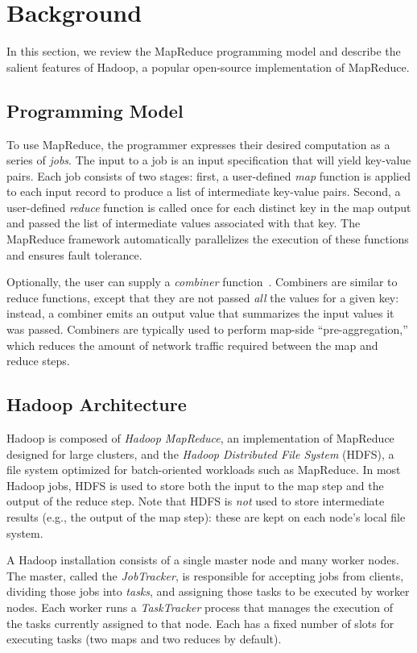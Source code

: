 \section{Background}
\label{sec:background}
In this section, we review the MapReduce programming model and describe the
salient features of Hadoop, a popular open-source implementation of MapReduce.

\subsection{Programming Model}
\label{sec:progmodel}
To use MapReduce, the programmer expresses their desired computation as a series
of \emph{jobs}. The input to a job is an input specification that will yield
key-value pairs. Each job consists of two stages: first, a user-defined
\emph{map} function is applied to each input record to produce a list of
intermediate key-value pairs. Second, a user-defined \emph{reduce} function is
called once for each distinct key in the map output and passed the list of
intermediate values associated with that key.  The MapReduce framework
automatically parallelizes the execution of these functions and ensures fault
tolerance.

Optionally, the user can supply a \emph{combiner}
function~\cite{mapreduce-osdi}. Combiners are similar to reduce functions,
except that they are not passed \emph{all} the values for a given key: instead,
a combiner emits an output value that summarizes the input values it was
passed. Combiners are typically used to perform map-side ``pre-aggregation,''
which reduces the amount of network traffic required between the map and reduce
steps.

\subsection{Hadoop Architecture}
Hadoop is composed of \emph{Hadoop MapReduce}, an implementation of
MapReduce designed for large clusters, and the \emph{Hadoop
  Distributed File System} (HDFS), a file system optimized for
batch-oriented workloads such as MapReduce. In most Hadoop jobs, HDFS
is used to store both the input to the map step and the output of the
reduce step. Note that HDFS is \emph{not} used to store intermediate
results (e.g., the output of the map step): these are kept on each
node's local file system.

A Hadoop installation consists of a single master node and many worker
nodes. The master, called the \emph{JobTracker}, is responsible for
accepting jobs from clients, dividing those jobs into \emph{tasks},
and assigning those tasks to be executed by worker nodes. Each worker
runs a \emph{TaskTracker} process that manages the execution of the
tasks currently assigned to that node. Each {\TT} has a fixed number
of slots for executing tasks (two maps and two reduces by
default).%

